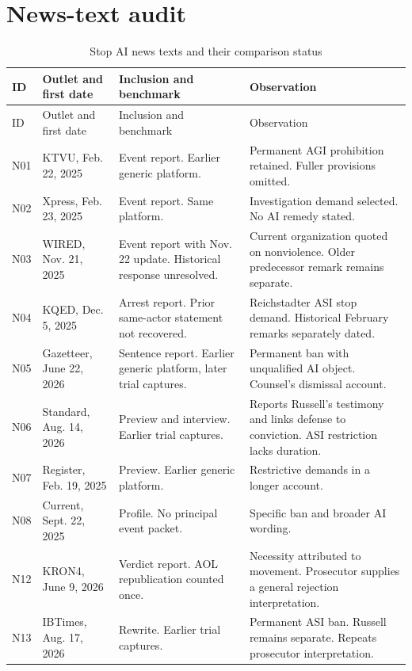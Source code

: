 \documentclass[11pt]{article}
\begin{document}
\section{News-text audit}
\label{app:news}
\begin{longtable}{P{0.05\textwidth}P{0.20\textwidth}P{0.27\textwidth}P{0.36\textwidth}}
\caption{Stop AI news texts and their comparison status}\\
\toprule ID & Outlet and first date & Inclusion and benchmark & Observation\\\midrule
\endfirsthead
\toprule ID & Outlet and first date & Inclusion and benchmark & Observation\\\midrule
\endhead
\bottomrule\endfoot
N01 & KTVU, Feb. 22, 2025 & Event report. Earlier generic platform. & Permanent AGI prohibition retained. Fuller provisions omitted.\\
N02 & Xpress, Feb. 23, 2025 & Event report. Same platform. & Investigation demand selected. No AI remedy stated.\\
N03 & WIRED, Nov. 21, 2025 & Event report with Nov. 22 update. Historical response unresolved. & Current organization quoted on nonviolence. Older predecessor remark remains separate.\\
N04 & KQED, Dec. 5, 2025 & Arrest report. Prior same-actor statement not recovered. & Reichstadter ASI stop demand. Historical February remarks separately dated.\\
N05 & Gazetteer, June 22, 2026 & Sentence report. Earlier generic platform, later trial captures. & Permanent ban with unqualified AI object. Counsel's dismissal account.\\
N06 & Standard, Aug. 14, 2026 & Preview and interview. Earlier trial captures. & Reports Russell's testimony and links defense to conviction. ASI restriction lacks duration.\\
N07 & Register, Feb. 19, 2025 & Preview. Earlier generic platform. & Restrictive demands in a longer account.\\
N08 & Current, Sept. 22, 2025 & Profile. No principal event packet. & Specific ban and broader AI wording.\\
N12 & KRON4, June 9, 2026 & Verdict report. AOL republication counted once. & Necessity attributed to movement. Prosecutor supplies a general rejection interpretation.\\
N13 & IBTimes, Aug. 17, 2026 & Rewrite. Earlier trial captures. & Permanent ASI ban. Russell remains separate. Repeats prosecutor interpretation.\\

\end{longtable}
\end{document}
